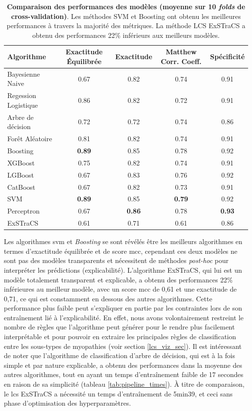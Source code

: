 \begin{table}[!ht]
\centering
\begin{tabular}{lcccc}
\hline
Algorithme & Exactitude Équilibrée & Exactitude & Matthew Corr. Coeff. & Spécificité  \\
\hline
Bayesienne Naive & 0.67 & 0.82 & 0.74 & 0.91 \\
Regession Logistique & 0.86 & 0.82 & 0.72 & 0.91 \\
Arbre de décision & 0.72 & 0.72 & 0.74 & 0.86 \\
Forêt Aléatoire & 0.81 & 0.82 & 0.74 & 0.91 \\
Boosting & \textbf{0.89} & 0.85 & 0.78 & 0.92 \\
XGBoost & 0.75 & 0.82 & 0.74 & 0.91 \\
LGBoost & 0.67 & 0.83 & 0.76 & 0.92 \\
CatBoost & 0.67 & 0.82 & 0.73 & 0.91 \\
SVM & \textbf{0.89} & 0.85 & \textbf{0.79} & 0.92 \\
Perceptron & 0.67 & \textbf{0.86} & 0.78 & \textbf{0.93}\\
ExSTraCS & 0.61 & 0.71 & 0.61 & 0.86 \\
\hline
\end{tabular}
\caption[Comparaison des performances des modèles (moyenne sur 10 folds de cross-validation)]{\textbf{Comparaison des performances des modèles (moyenne sur 10 \textit{folds} de cross-validation)}. Les méthodes SVM et Boosting ont obtenu les meilleures performances à travers la majorité des métriques. La méthode LCS ExSTraCS a obtenu des performances 22\% inférieurs aux meilleurs modèles.}
\label{table:ml_metrics}
\end{table}        
Les algorithmes \gls{svm} et \textit{Boosting } se sont révélés être les meilleurs algorithmes en termes d'exactitude équilibrée et de score \gls{mcc}, cependant ces deux modèles ne sont pas des modèles transparents et nécessitent de méthodes \textit{post-hoc} pour interpréter les prédictions (explicabilité). L'algorithme ExSTraCS, qui lui est un modèle totalement transparent et explicable, a obtenu des performances 22\% inférieures au meilleur modèle, avec un score \gls{mcc} de 0,61 et une exactitude de 0,71, ce qui est constamment en dessous des autres algorithmes. Cette performance plus faible peut s'expliquer en partie par les contraintes lors de son entraînement lié à l'explicabilité. En effet, nous avons volontairement restreint le nombre de règles que l'algorithme peut générer pour le rendre plus facilement interprétable et pour pouvoir en extraire les principales règles de classification entre les sous-types de myopathies (voir section \ref{lcs_viz_sec}). Il est intéressant de noter que l'algorithme de classification d'arbre de décision, qui est à la fois simple et par nature explicable, a obtenu des performances dans la moyenne des autres algorithmes, tout en ayant un temps d'entraînement faible de 17 secondes en raison de sa simplicité (tableau \ref{tab:pipeline_times}). À titre de comparaison, le \gls{lcs} ExSTraCS a nécessité un temps d'entraînement de 5min39, et ceci sans phase d'optimisation des hyperparamètres.
